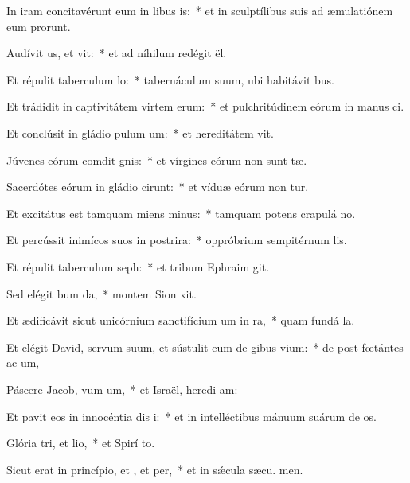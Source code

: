\item In iram concitavérunt eum in libus is:~* et in sculptílibus suis ad æmulatiónem eum prorunt.
\item Audívit us, et vit:~* et ad níhilum redégit  ël.
\item Et répulit taberculum lo:~* tabernáculum suum, ubi habitávit  bus.
\item Et trádidit in captivitátem virtem erum:~* et pulchritúdinem eórum in manus ci.
\item Et conclúsit in gládio pulum um:~* et hereditátem  vit.
\item Júvenes eórum comdit gnis:~* et vírgines eórum non sunt tæ.
\item Sacerdótes eórum in gládio cirunt:~* et víduæ eórum non tur.
\item Et excitátus est tamquam miens minus:~* tamquam potens crapulá  no.
\item Et percússit inimícos suos in postrira:~* oppróbrium sempitérnum  lis.
\item Et répulit taberculum seph:~* et tribum Ephraim  git.
\item Sed elégit bum da,~* montem Sion  xit.
\item Et ædificávit sicut unicórnium sanctifícium um in ra,~* quam fundá  la.
\item Et elégit David, servum suum, et sústulit eum de gibus vium:~* de post fœtántes ac um,
\item Páscere Jacob, vum um,~* et Israël, heredi am:
\item Et pavit eos in innocéntia dis i:~* et in intelléctibus mánuum suárum de os.
\item Glória tri, et lio,~* et Spirí to.
\item Sicut erat in princípio, et , et per,~* et in sǽcula sæcu. men.
